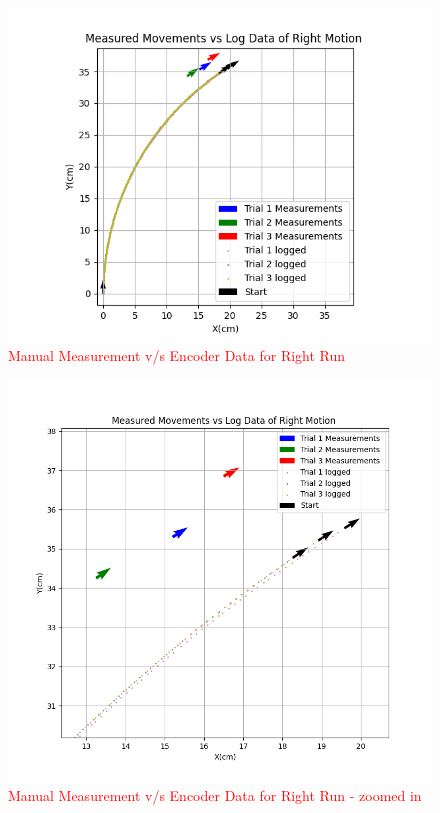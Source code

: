 {        \begin{figure}[!ht] 
            \centering \includegraphics[scale=.60]{"images/experiment_2/Figure_right.png"}
            \caption{\textcolor{red}{Manual Measurement v/s Encoder Data for Right Run}}
            \label{fig:right-manual-encoder}
        \end{figure}
        
        \begin{figure}[!ht] 
            \centering \includegraphics[scale=.50]{"images/experiment_2/Figure_right_zoom.png"}
            \caption{\textcolor{red}{Manual Measurement v/s Encoder Data for Right Run - zoomed in}}
            \label{fig:right-manual-encoder-zoom}
        \end{figure}
        
}
